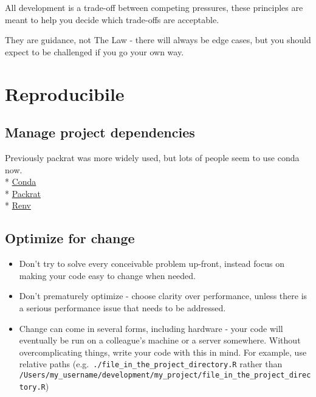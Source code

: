 \documentclass[]{book}
\providecommand{\tightlist}{%
  \setlength{\itemsep}{0pt}\setlength{\parskip}{0pt}}
\begin{document}
All development is a trade-off between competing pressures, these principles are meant to help you decide which trade-offs are acceptable.

They are guidance, not The Law - there will always be edge cases, but you should expect to be challenged if you go your own way.

\hypertarget{reproduce}{%
\section{Reproducibile}\label{reproduce}}

\hypertarget{projdep}{%
\subsection{Manage project dependencies}\label{projdep}}

Previously packrat was more widely used, but lots of people seem to use conda now.\\
* \href{https://github.com/moj-analytical-services/coffee-and-coding-public/blob/master/2019-10-30\%20Conda/conda.pdf}{Conda}\\
* \href{https://rstudio.github.io/packrat/}{Packrat}\\
* \href{https://blog.rstudio.com/2019/11/06/renv-project-environments-for-r/}{Renv}

\hypertarget{change}{%
\subsection{Optimize for change}\label{change}}

\begin{itemize}
\tightlist
\item
  Don't try to solve every conceivable problem up-front, instead focus on making your code easy to change when needed.
\item
  Don't prematurely optimize - choose clarity over performance, unless there is a serious performance issue that needs to be addressed.
\item
  Change can come in several forms, including hardware - your code will eventually be run on a colleague's machine or a server somewhere. Without overcomplicating things, write your code with this in mind. For example, use relative paths (e.g.~\texttt{./file\_in\_the\_project\_directory.R} rather than \texttt{/Users/my\_username/development/my\_project/file\_in\_the\_project\_directory.R})
\end{itemize}
\end{document}
